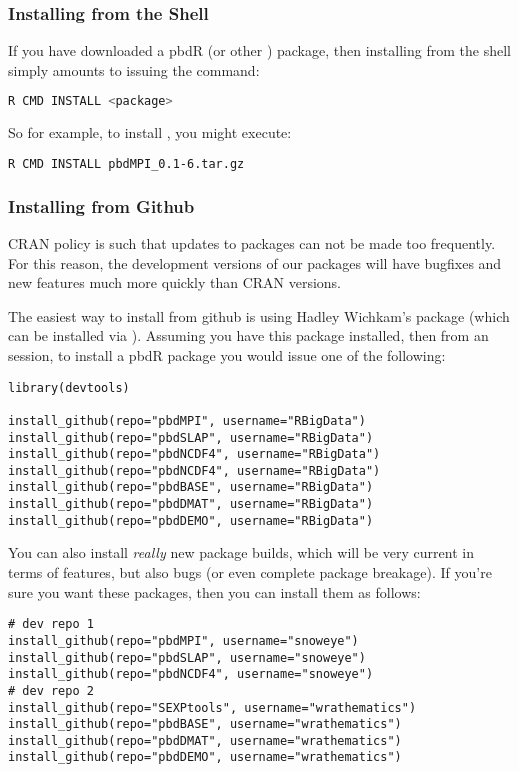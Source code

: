 \subsubsection{Installing from the Shell}
If you have downloaded a pbdR (or other ) package, then installing from the shell simply amounts to issuing the command:
\begin{lstlisting}[language=sh]
R CMD INSTALL <package>
\end{lstlisting}
So for example, to install , you might execute:
\begin{lstlisting}[language=sh]
R CMD INSTALL pbdMPI_0.1-6.tar.gz
\end{lstlisting}


\subsubsection{Installing from Github}
CRAN policy is such that updates to packages can not be made too frequently.  For this reason, the development versions of our packages will have bugfixes and new features much more quickly than CRAN versions.  

The easiest way to install from github is using Hadley Wichkam's  package (which can be installed via ).  Assuming you have this package installed, then from an  session, to install a pbdR package you would issue one of the following:

\begin{lstlisting}[language=rr]
library(devtools)

install_github(repo="pbdMPI", username="RBigData")
install_github(repo="pbdSLAP", username="RBigData")
install_github(repo="pbdNCDF4", username="RBigData")
install_github(repo="pbdNCDF4", username="RBigData")
install_github(repo="pbdBASE", username="RBigData")
install_github(repo="pbdDMAT", username="RBigData")
install_github(repo="pbdDEMO", username="RBigData")
\end{lstlisting}

You can also install \emph{really} new package builds, which will be very current in terms of features, but also bugs (or even complete package breakage).  If you're sure you want these packages, then you can install them as follows:

\begin{lstlisting}[language=rr]
# dev repo 1
install_github(repo="pbdMPI", username="snoweye")
install_github(repo="pbdSLAP", username="snoweye")
install_github(repo="pbdNCDF4", username="snoweye")
# dev repo 2
install_github(repo="SEXPtools", username="wrathematics")
install_github(repo="pbdBASE", username="wrathematics")
install_github(repo="pbdDMAT", username="wrathematics")
install_github(repo="pbdDEMO", username="wrathematics")
\end{lstlisting}



